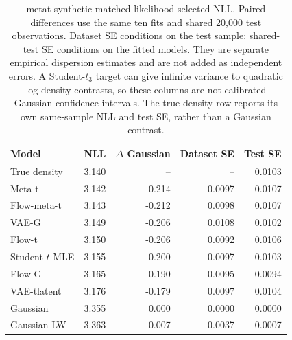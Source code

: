 \documentclass[11pt]{article}
\theoremstyle{definition}\newtheorem{definition}[theorem]{Definition}
\theoremstyle{remark}\newtheorem{remark}[theorem]{Remark}
\begin{document}
\begin{table}[htbp]
\centering\footnotesize
\setlength{\tabcolsep}{4pt}
\begin{tabular}{lrrrr}
\toprule
Model & NLL & $\Delta$ Gaussian & Dataset SE & Test SE \\
\midrule
True density & 3.140 & -- & -- & 0.0103 \\
Meta-t & 3.142 & -0.214 & 0.0097 & 0.0107 \\
Flow-meta-t & 3.143 & -0.212 & 0.0098 & 0.0107 \\
VAE-G & 3.149 & -0.206 & 0.0108 & 0.0102 \\
Flow-t & 3.150 & -0.206 & 0.0092 & 0.0106 \\
Student-$t$ MLE & 3.155 & -0.200 & 0.0097 & 0.0103 \\
Flow-G & 3.165 & -0.190 & 0.0095 & 0.0094 \\
VAE-tlatent & 3.176 & -0.179 & 0.0097 & 0.0104 \\
Gaussian & 3.355 & 0.000 & 0.0000 & 0.0000 \\
Gaussian-LW & 3.363 & 0.007 & 0.0037 & 0.0007 \\
\bottomrule
\end{tabular}
\caption{metat synthetic matched likelihood-selected NLL. Paired differences use the same ten fits and shared 20,000 test observations. Dataset SE conditions on the test sample; shared-test SE conditions on the fitted models. They are separate empirical dispersion estimates and are not added as independent errors. A Student-$t_3$ target can give infinite variance to quadratic log-density contrasts, so these columns are not calibrated Gaussian confidence intervals. The true-density row reports its own same-sample NLL and test SE, rather than a Gaussian contrast.}\label{tab:r4-density-metat}
\end{table}
\end{document}
